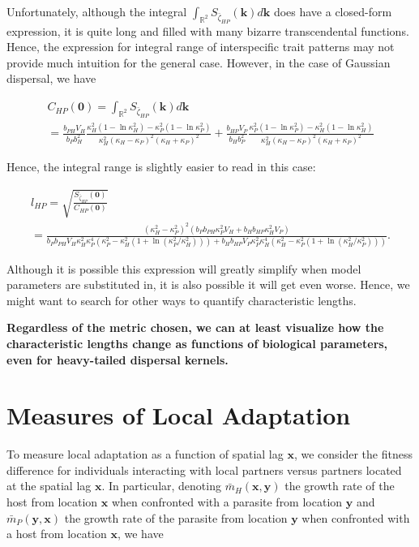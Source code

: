 \documentclass{article}
\begin{document}
Unfortunately, although the integral
\(\int_{\mathbb R^2}S_{\bar\zeta_{HP}}(\pmb k)d\pmb k\) does have a
closed-form expression, it is quite long and filled with many bizarre
transcendental functions. Hence, the expression for integral range of
interspecific trait patterns may not provide much intuition for the
general case. However, in the case of Gaussian dispersal, we have

\begin{multline}
  C_{HP}(\pmb 0)=\int_{\mathbb R^2}S_{\bar\zeta_{HP}}(\pmb k)d\pmb k \\
    =\frac{b_{PH}V_H}{b_Pb_H^2}\frac{\kappa_H^2(1-\ln\kappa_H^2)-\kappa_P^2(1-\ln\kappa_P^2)}{\kappa_H^2(\kappa_H-\kappa_P)^2(\kappa_H+\kappa_P)^2}
      +\frac{b_{HP}V_P}{b_Hb_P^2}\frac{\kappa_P^2(1-\ln\kappa_P^2)-\kappa_H^2(1-\ln\kappa_H^2)}{\kappa_H^2(\kappa_H-\kappa_P)^2(\kappa_H+\kappa_P)^2}
\end{multline}

Hence, the integral range is slightly easier to read in this case:

\begin{multline}
  l_{HP} = \sqrt{\frac{S_{\bar\zeta_{HP}}(\pmb 0)}{C_{HP}(\pmb 0)}} \\
    =\frac{(\kappa_H^2-\kappa_P^2)^2(b_Pb_{PH}\kappa_P^2V_H+b_Hb_{HP}\kappa_H^2V_P)}{b_Pb_{PH}V_H\kappa_H^2\kappa_P^4(\kappa_P^2-\kappa_H^2(1+\ln(\kappa_P^2/\kappa_H^2)))+b_Hb_{HP}V_P\kappa_P^2\kappa_H^4(\kappa_H^2-\kappa_P^2(1+\ln(\kappa_H^2/\kappa_P^2)))}.
\end{multline}

Although it is possible this expression will greatly simplify when model
parameters are substituted in, it is also possible it will get even
worse. Hence, we might want to search for other ways to quantify
characteristic lengths.

\textbf{Regardless of the metric chosen, we can at least visualize how
the characteristic lengths change as functions of biological parameters,
even for heavy-tailed dispersal kernels.}

\hypertarget{measures-of-local-adaptation}{%
\section{Measures of Local
Adaptation}\label{measures-of-local-adaptation}}

To measure local adaptation as a function of spatial lag \(\pmb x\), we
consider the fitness difference for individuals interacting with local
partners versus partners located at the spatial lag \(\pmb x\). In
particular, denoting \(\bar m_H(\pmb x,\pmb y)\) the growth rate of the
host from location \(\pmb x\) when confronted with a parasite from
location \(\pmb y\) and \(\bar m_P(\pmb y,\pmb x)\) the growth rate of
the parasite from location \(\pmb y\) when confronted with a host from
location \(\pmb x\), we have
\end{document}
